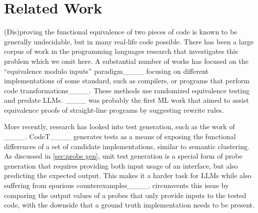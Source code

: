 \section{Related Work}
(Dis)proving the functional equivalence of two pieces of code is known to be generally undecidable, but in many real-life code possible. There has been a large corpus of work in the programming languages research that investigates this problem which we omit here.
A substantial number of works has focused on the ``equivalence modulo inputs'' paradigm____ focusing on different implementations of some standard, such as compilers, or programs that perform code transformations____.
These methods use randomized equivalence testing and predate LLMs.
____ was probably the first ML work that aimed to assist equivalence proofs of straight-line programs by suggesting rewrite rules.

More recently, research has looked into test generation, such as the work of ____. CodeT____ generates tests as a means of exposing the functional differences of a set of candidate implementations, similar to semantic clustering.
As discussed in \autoref{sec:probe gen}, unit test generation is a special form of probe generation that requires providing both input usage of an interface, but also predicting the expected output.
This makes it a harder task for LLMs while also suffering from spurious counterexamples____.
\probgen circumvents this issue by comparing the output values of a probes that only provide inputs to the tested code, with the downside that a ground truth implementation needs to be present.